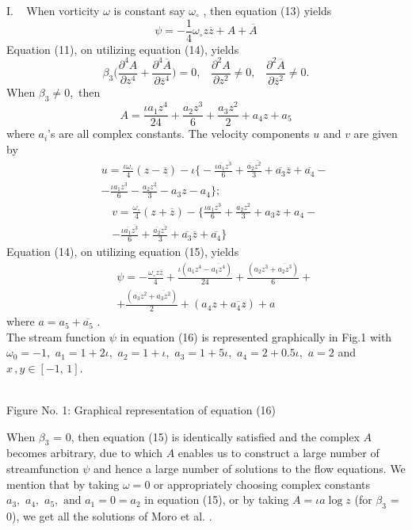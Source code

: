 \documentclass[twocolumn,showpacs,preprintnumbers,amsmath,amssymb]{revtex4}
\newcommand{\bea}{\begin{eqnarray}}
\newcommand{\eea}{\end{eqnarray}}
\begin{document}
I. \,\,\, When vorticity $\omega$  is constant say $\omega_{\circ}$
, then equation (13) yields
\begin{equation}
\psi=-\frac{1}{4}\omega_{\circ}z\overline{z}+A+\overline{A}
\end{equation}
Equation (11), on utilizing equation (14), yields
\begin{equation}
\beta_{3}\Big(\frac{\partial^{4}A}{\partial
z^{4}}+\frac{\partial^{4}\overline{A}}{\partial\overline{z}^{4}}\Big)=0,\,\,\,\,\,
\frac{\partial^{2}A}{\partial z^{2}}\neq
0,\,\,\,\,\,\frac{\partial^{2}\overline{A}}{\partial\overline{z}^{2}}\neq
0.\nonumber
\end{equation}
When $\beta_{3}\neq 0$,\,\,\,then
\begin{equation}
A=\frac{\iota
a_{1}z^{4}}{24}+\frac{a_{2}z^{3}}{6}+\frac{a_{3}z^{2}}{2}+a_{4}z+a_{5}
\end{equation}
where $a_{i}$'s  are all complex constants. The velocity components
$u$ and $v$ are given by \bea\nonumber&& u=\frac{\iota
\omega_{\circ}}{4}(z-\overline{z})-\iota\Big\{-\frac{\iota
\overline{a_{1}}\overline{z^{3}}}{6}+\frac{\overline{a_{2}}\overline{z^{2}}}{3}
+\overline{a_{3}}\overline{z}+\overline{a_{4}}-\\&&-\frac{\iota
a_{1}z^{3}}{6}-\frac{a_{2}z^{2}}{3}-a_{3}z-a_{4}\Big\};\nonumber
\eea \bea\nonumber&&
v=\frac{\omega_{\circ}}{4}(z+\overline{z})-\Big\{\frac{\iota
a_{1}z^{3}}{6}+\frac{a_{2}z^{2}}{3}+a_{3}z+a_{4}-\\&&-\frac{\iota
\overline{a_{1}}\overline{z^{3}}}{6}+\frac{\overline{a_{2}}\overline{z^{2}}}{3}
+\overline{a_{3}}\overline{z}+\overline{a_{4}}\Big\}\nonumber \eea
Equation (14), on utilizing equation (15), yields \bea \nonumber &&
\psi=-\frac{\omega_{\circ}z\overline{z}}{4} +\frac{\iota
(a_{1}z^{4}-\overline{a_{1}z^{4}})}{24}+\frac{(a_{2}z^{3}+\overline{a_{2}z^{3}})}{6}
+\\&& +\frac{(a_{3}z^{2}+\overline{a_{3}z^{2}})}{2}+
(a_{4}z+\overline{a_{4}z})+a \eea where $a = a_5 +
\overline{a_{5}}$\,\,.\\
The stream function $\psi$ in equation (16) is represented
graphically in Fig.1 with $\omega_0 = -1 ,\,\, a_1 = 1 + 2\iota
,\,\, a_2 = 1 + \iota ,\,\, a_3 = 1 + 5\iota ,\,\, a_4 = 2 +
0.5\iota ,\,\, a = 2$ and $ x\, , y \in [-1,\,1]$.
\begin{center}
\\Figure No. 1: Graphical
representation of equation (16)
\end{center}
When $\beta_{3}$  = 0, then equation (15) is identically satisfied
and the complex $A$ becomes arbitrary, due to which $A$  enables us
to construct a large number of streamfunction $\psi$  and hence a
large number of solutions to the flow equations. We mention that by
taking $\omega = 0$  or appropriately choosing complex constants
$a_{3},\,\,a_{4},\,\,a_{5},\,\,\mbox{and}\,\,a_{1}=0=a_{2}$ in
equation (15), or by taking $A=\iota a\log z$ (for$\,\,\beta_{3}$ =
0), we get all the solutions of Moro et al. \cite{Moro}.
\end{document}

